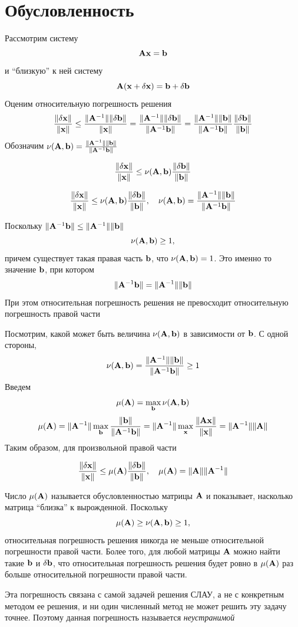 \documentclass[professionalfonts,compress,unicode]{beamer}
\begin{document}
\section{Обусловленность}
{
	Рассмотрим систему 
	$$
	{\bf A}{\bf x} = {\bf b}
	$$
	и ``близкую'' к ней систему
	$$
	{\bf A}({\bf x}+\delta {\bf x}) = {\bf b} + \delta {\bf b}
	$$
	Оценим относительную погрешность решения
	$$
	\frac{\|\delta{\bf x}\|}{\|{\bf x}\|} \leq \frac{\|{\bf A}^{-1}\|\|\delta {\bf b}\|}{\|{\bf x}\|} =
	\frac{\|{\bf A}^{-1}\|\|\delta {\bf b}\|}{\|{\bf A}^{-1}{\bf b}\|} =
	\frac{\|{\bf A}^{-1}\|\|{\bf b}\|}{\|{\bf A}^{-1}{\bf b}\|}\frac{\|\delta {\bf b}\|}{\|{\bf b}\|}
	$$
	Обозначим $\nu({\bf A},{\bf b}) = \frac{\|{\bf A}^{-1}\|\|{\bf b}\|}{\|{\bf A}^{-1}{\bf b}\|}$
	\begin{block}{}
	$$\frac{\|\delta{\bf x}\|}{\|{\bf x}\|} \leq \nu({\bf A},{\bf b}) \frac{\|\delta {\bf b}\|}{\|{\bf b}\|}$$
	\end{block}
}

{
	\begin{block}{}
	$$\frac{\|\delta{\bf x}\|}{\|{\bf x}\|} \leq \nu({\bf A},{\bf b}) \frac{\|\delta {\bf b}\|}{\|{\bf b}\|}, \quad \nu({\bf A},{\bf b}) = \frac{\|{\bf A}^{-1}\|\|{\bf b}\|}{\|{\bf A}^{-1}{\bf b}\|}$$
	\end{block}
	Поскольку $\|{\bf A}^{-1}{\bf b}\| \leq \|{\bf A}^{-1}\|\|{\bf b}\|$
	$$
	\nu({\bf A},{\bf b}) \geq 1,
	$$
	причем существует такая правая часть ${\bf b}$, что $\nu({\bf A},{\bf b}) = 1$. Это именно то значение ${\bf b}$, при котором
	$$
	\| {\bf A}^{-1} {\bf b} \| = \|{\bf A}^{-1}\| \|{\bf b}\|
	$$
	При этом относительная погрешность решения не превосходит относительную погрешность правой части
}

{
	Посмотрим, какой может быть величина $\nu({\bf A},{\bf b})$ в зависимости от ${\bf b}$. С одной стороны,
	$$
	\nu({\bf A},{\bf b}) = \frac{\|{\bf A}^{-1}\|\|{\bf b}\|}{\|{\bf A}^{-1}{\bf b}\|} \geq 1
	$$
	Введем
	$$
	\mu({\bf A}) = \max_{{\bf b}} \nu({\bf A}, {\bf b})
	$$
	$$
	\mu({\bf A}) = \|{\bf A}^{-1}\|\max_{{\bf b}} \frac{\|{\bf b}\|}{\|{\bf A}^{-1}{\bf b}\|} = \|{\bf A}^{-1}\|\max_{{\bf x}} \frac{\|{\bf A}{\bf x}\|}{\|{\bf x}\|} = \|{\bf A}^{-1}\| \|{\bf A}\|
	$$
	Таким образом, для произвольной правой части
	\begin{block}{}
	$$\frac{\|\delta{\bf x}\|}{\|{\bf x}\|} \leq \mu({\bf A}) \frac{\|\delta {\bf b}\|}{\|{\bf b}\|}, \quad \mu({\bf A}) = \|{\bf A}\|\|{\bf A}^{-1}\|$$
	\end{block}	
}

{
	Число $\mu({\bf A})$ называется обусловленностью матрицы ${\bf A}$ и показывает,
	насколько матрица ``близка'' к вырожденной. Поскольку
	$$
	\mu({\bf A}) \geq \nu({\bf A},{\bf b}) \geq 1,
	$$
	относительная погрешность решения никогда не меньше относительной погрешности правой части. Более того, для любой матрицы ${\bf A}$ 
	можно найти такие ${\bf b}$ и $\delta {\bf b}$, что относительная погрешность решения будет ровно в $\mu({\bf A})$ раз больше относительной
	погрешности правой части.
	
	Эта погрешность связана с самой задачей решения СЛАУ, а не с конкретным методом ее решения, и ни один численный метод
	не может решить эту задачу точнее. Поэтому данная погрешность называется \emph{неустранимой}
}
\end{document}
